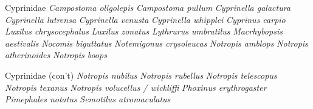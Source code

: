 \documentclass[11pt, hidelinks]{exam}
\begin{document}
\begin{multicols}{2}
Cyprinidae\newline
	\hspace*{1em}\textit{Campostoma oligolepis}\newline
	\hspace*{1em}\textit{Campostoma pullum}\newline
	\hspace*{1em}\textit{Cyprinella galactura}\newline
	\hspace*{1em}\textit{Cyprinella lutrensa}\newline
	\hspace*{1em}\textit{Cyprinella venusta}\newline
	\hspace*{1em}\textit{Cyprinella whipplei}\newline
	\hspace*{1em}\textit{Cyprinus carpio}\newline
	\hspace*{1em}\textit{Luxilus chrysocephalus}\newline
	\hspace*{1em}\textit{Luxilus zonatus}\newline
	\hspace*{1em}\textit{Lythrurus umbratilus}\newline
	\hspace*{1em}\textit{Macrhybopsis aestivalis}\newline
	\hspace*{1em}\textit{Nocomis biguttatus}\newline
	\hspace*{1em}\textit{Notemigonus crysoleucas}\newline
	\hspace*{1em}\textit{Notropis amblops}\newline
	\hspace*{1em}\textit{Notropis atherinoides}\newline
	\hspace*{1em}\textit{Notropis boops}
	
Cyprinidae (con’t)\newline
	\hspace*{1em}\textit{Notropis nubilus}\newline
	\hspace*{1em}\textit{Notropis rubellus}\newline
	\hspace*{1em}\textit{Notropis telescopus}\newline
	\hspace*{1em}\textit{Notropis texanus}\newline
	\hspace*{1em}\textit{Notropis volucellus / wickliffi}\newline
	\hspace*{1em}\textit{Phoxinus erythrogaster}\newline
	\hspace*{1em}\textit{Pimephales notatus}\newline
	\hspace*{1em}\textit{Semotilus atromaculatus}


\end{multicols}
\end{document}
